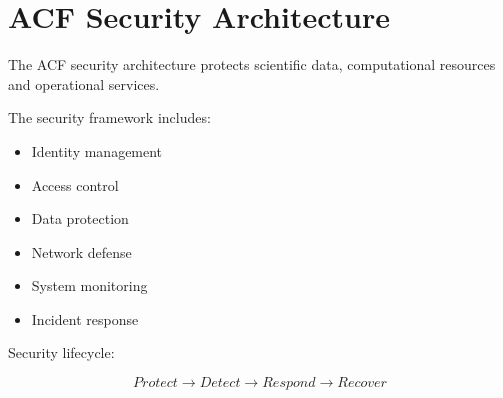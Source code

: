 \section{ACF Security Architecture}


The ACF security architecture protects scientific data,
computational resources and operational services.



The security framework includes:


\begin{itemize}

\item Identity management

\item Access control

\item Data protection

\item Network defense

\item System monitoring

\item Incident response

\end{itemize}



Security lifecycle:


\[
Protect
\rightarrow
Detect
\rightarrow
Respond
\rightarrow
Recover
\]
